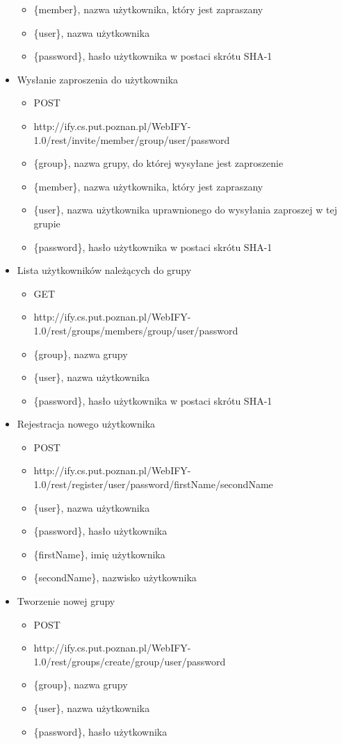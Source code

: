 \documentclass[11pt,a4paper,polish,thesis]{dcsbook}
\begin{document}
\begin{itemize}
\begin{itemize}
\item \{member\}, nazwa użytkownika, który jest zapraszany
\item \{user\}, nazwa użytkownika
\item \{password\},  hasło użytkownika w postaci skrótu SHA-1
\end{itemize}
\item Wysłanie zaproszenia do użytkownika
\begin{itemize}
\item POST
\item http://ify.cs.put.poznan.pl/WebIFY-1.0/rest/invite/{member}/{group}/{user}/{password}
\item \{group\}, nazwa grupy, do której wysyłane jest zaproszenie
\item \{member\}, nazwa użytkownika, który jest zapraszany
\item \{user\}, nazwa użytkownika uprawnionego do wysyłania zaproszej w tej grupie
\item \{password\},  hasło użytkownika w postaci skrótu SHA-1
\end{itemize}
\item Lista użytkowników należących do grupy
\begin{itemize}
\item GET
\item http://ify.cs.put.poznan.pl/WebIFY-1.0/rest/groups/members/{group}/{user}/{password}
\item \{group\}, nazwa grupy
\item \{user\}, nazwa użytkownika
\item \{password\},  hasło użytkownika w postaci skrótu SHA-1
\end{itemize}
\item Rejestracja nowego użytkownika
\begin{itemize}
\item POST
\item http://ify.cs.put.poznan.pl/WebIFY-1.0/rest/register/{user}/{password}/{firstName}/{secondName}
\item \{user\}, nazwa użytkownika
\item \{password\},  hasło użytkownika 
\item \{firstName\}, imię użytkownika
\item \{secondName\}, nazwisko użytkownika
\end{itemize}
\item Tworzenie nowej grupy
\begin{itemize}
\item POST
\item http://ify.cs.put.poznan.pl/WebIFY-1.0/rest/groups/create/{group}/{user}/{password}
\item \{group\}, nazwa grupy
\item \{user\}, nazwa użytkownika
\item \{password\},  hasło użytkownika 
\end{itemize}
\end{itemize}
\end{document}

